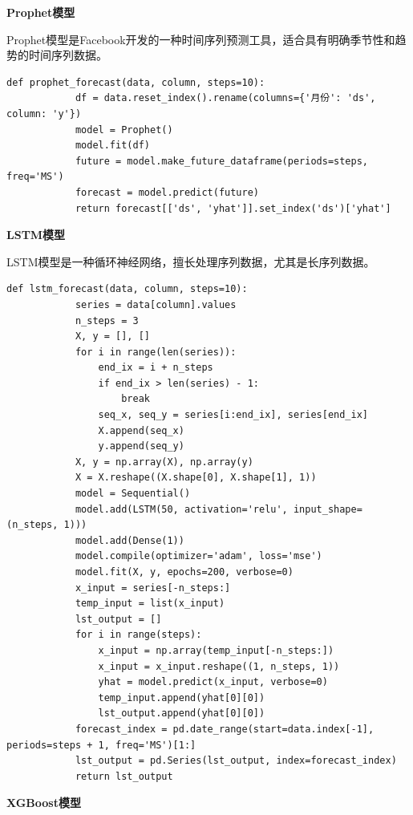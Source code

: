 \documentclass[a4paper]{article}
\begin{document}
	\textbf{Prophet模型}
	
	Prophet模型是Facebook开发的一种时间序列预测工具，适合具有明确季节性和趋势的时间序列数据。
	\begin{lstlisting}[caption={Python Example}, label={lst:example}]
		def prophet_forecast(data, column, steps=10):
			df = data.reset_index().rename(columns={'月份': 'ds', column: 'y'})
			model = Prophet()
			model.fit(df)
			future = model.make_future_dataframe(periods=steps, freq='MS')
			forecast = model.predict(future)
			return forecast[['ds', 'yhat']].set_index('ds')['yhat']

	\end{lstlisting}

	\textbf{LSTM模型}

	LSTM模型是一种循环神经网络，擅长处理序列数据，尤其是长序列数据。
	\begin{lstlisting}[caption={Python Example}, label={lst:example}]
		def lstm_forecast(data, column, steps=10):
			series = data[column].values
			n_steps = 3
			X, y = [], []
			for i in range(len(series)):
				end_ix = i + n_steps
				if end_ix > len(series) - 1:
					break
				seq_x, seq_y = series[i:end_ix], series[end_ix]
				X.append(seq_x)
				y.append(seq_y)
			X, y = np.array(X), np.array(y)
			X = X.reshape((X.shape[0], X.shape[1], 1))
			model = Sequential()
			model.add(LSTM(50, activation='relu', input_shape=(n_steps, 1)))
			model.add(Dense(1))
			model.compile(optimizer='adam', loss='mse')
			model.fit(X, y, epochs=200, verbose=0)
			x_input = series[-n_steps:]
			temp_input = list(x_input)
			lst_output = []
			for i in range(steps):
				x_input = np.array(temp_input[-n_steps:])
				x_input = x_input.reshape((1, n_steps, 1))
				yhat = model.predict(x_input, verbose=0)
				temp_input.append(yhat[0][0])
				lst_output.append(yhat[0][0])
			forecast_index = pd.date_range(start=data.index[-1], periods=steps + 1, freq='MS')[1:]
			lst_output = pd.Series(lst_output, index=forecast_index)
			return lst_output
	\end{lstlisting}

	\textbf{XGBoost模型}
\end{document}

